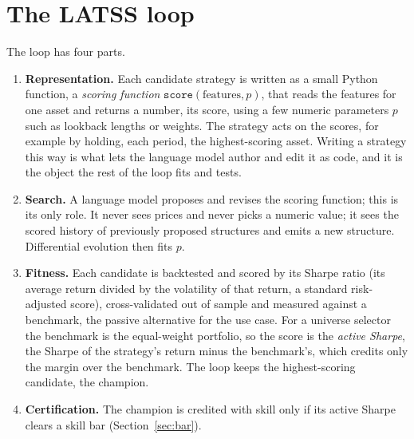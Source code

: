 \documentclass[11pt]{article}
\newcommand{\code}[1]{\texttt{#1}}
\begin{document}
\section{The LATSS loop}
\label{sec:loop}

The loop has four parts.

\begin{enumerate}[leftmargin=1.4em]
\item \textbf{Representation.} Each candidate strategy is written as a small Python function, a
\emph{scoring function} $\code{score}(\text{features}, p)$, that reads the features for one asset and
returns a number, its score, using a few numeric parameters $p$ such as lookback lengths or weights.
The strategy acts on the scores, for example by holding, each period, the highest-scoring asset.
Writing a strategy this way is what lets the language model author and edit it as code, and it is the
object the rest of the loop fits and tests.
\item \textbf{Search.} A language model proposes and revises the scoring function; this is its only
role. It never sees prices and never picks a numeric value; it sees the scored history of previously
proposed structures and emits a new structure. Differential evolution then fits $p$.
\item \textbf{Fitness.} Each candidate is backtested and scored by its Sharpe ratio (its average return
divided by the volatility of that return, a standard risk-adjusted score), cross-validated out of
sample and measured against a benchmark, the passive alternative for the use case. For a universe
selector the benchmark is the equal-weight portfolio, so the score is the \emph{active Sharpe}, the
Sharpe of the strategy's return minus the benchmark's, which credits only the margin over the benchmark.
The loop keeps the highest-scoring candidate, the champion.
\item \textbf{Certification.} The champion is credited with skill only if its active Sharpe clears a
skill bar (Section~\ref{sec:bar}).
\end{enumerate}
\end{document}
